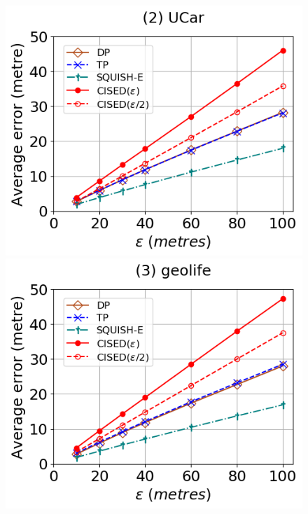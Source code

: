 \begin{figure}[tb!]
	\centering
	\includegraphics[scale = 0.320]{Figures/Exp-query-SED-error-epsilon-service.png}\hspace{3ex}
	\includegraphics[scale = 0.320]{Figures/Exp-query-SED-error-epsilon-geolife.png}\hspace{3ex}

\end{figure}
